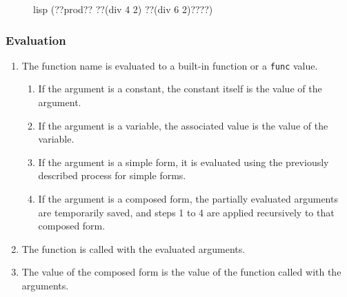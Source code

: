 \documentclass[a4paper, 12pt]{article}
\begin{document}
\begin{figure}[htp]
    \centering
    \begin{cminted}[autogobble=true, escapeinside=??]{lisp}
        (??prod?? ??(div 4 2) ??(div 6 2)????)
    \end{cminted}
    \captionsetup[figure]{font=small, skip=3.5em}
\end{figure}

\subsubsection{Evaluation}
\begin{enumerate}
    \item The function name is evaluated to a built-in function or a \texttt{func} value.
    \begin{enumerate}
        \item If the argument is a constant, the constant itself is the value of the argument.
        \item If the argument is a variable, the associated value is the value of the variable.
        \item If the argument is a simple form, it is evaluated using the previously described process for simple forms.
        \item If the argument is a composed form, the partially evaluated arguments are temporarily saved, and steps 1 to 4 are applied recursively to that composed form.
    \end{enumerate}
    \item The function is called with the evaluated arguments.
    \item The value of the composed form is the value of the function called with the arguments.
\end{enumerate}
\end{document}
